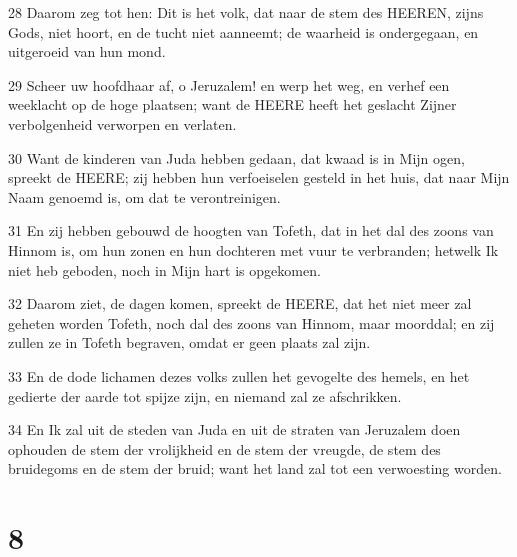 \par 28 Daarom zeg tot hen: Dit is het volk, dat naar de stem des HEEREN, zijns Gods, niet hoort, en de tucht niet aanneemt; de waarheid is ondergegaan, en uitgeroeid van hun mond.
\par 29 Scheer uw hoofdhaar af, o Jeruzalem! en werp het weg, en verhef een weeklacht op de hoge plaatsen; want de HEERE heeft het geslacht Zijner verbolgenheid verworpen en verlaten.
\par 30 Want de kinderen van Juda hebben gedaan, dat kwaad is in Mijn ogen, spreekt de HEERE; zij hebben hun verfoeiselen gesteld in het huis, dat naar Mijn Naam genoemd is, om dat te verontreinigen.
\par 31 En zij hebben gebouwd de hoogten van Tofeth, dat in het dal des zoons van Hinnom is, om hun zonen en hun dochteren met vuur te verbranden; hetwelk Ik niet heb geboden, noch in Mijn hart is opgekomen.
\par 32 Daarom ziet, de dagen komen, spreekt de HEERE, dat het niet meer zal geheten worden Tofeth, noch dal des zoons van Hinnom, maar moorddal; en zij zullen ze in Tofeth begraven, omdat er geen plaats zal zijn.
\par 33 En de dode lichamen dezes volks zullen het gevogelte des hemels, en het gedierte der aarde tot spijze zijn, en niemand zal ze afschrikken.
\par 34 En Ik zal uit de steden van Juda en uit de straten van Jeruzalem doen ophouden de stem der vrolijkheid en de stem der vreugde, de stem des bruidegoms en de stem der bruid; want het land zal tot een verwoesting worden.

\chapter{8}

